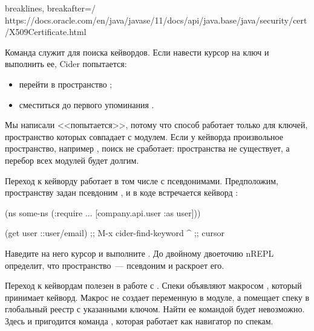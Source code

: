 \begin{english}
  \begin{text*}{breaklines, breakafter=/}
https://docs.oracle.com/en/java/javase/11/docs/api/java.base/java/security/cert/X509Certificate.html
  \end{text*}
\end{english}

Команда  служит для поиска кейвордов. Если навести курсор на ключ  и выполнить ее, Cider попытается:

\begin{itemize}

\item
  перейти в пространство ;

\item
  сместиться до первого упоминания .

\end{itemize}

Мы написали <<попытается>>, потому что способ работает только для ключей, пространство которых совпадает с модулем. Если у кейворда произвольное пространство, например , поиск не сработает: пространства  не существует, а перебор всех модулей будет долгим.

Переход к кейворду работает в том числе с псевдонимами. Предположим, пространству  задан псевдоним , и в коде встречается кейворд :

\begin{english}
  \begin{clojure}
(ns some-ns
  (:require
   ...
   [company.api.user :as user]))

(get user ::user/email) ;; M-x cider-find-keyword
                ^       ;; cursor
  \end{clojure}
\end{english}

Наведите на него курсор и выполните . До двойному двоеточию nREPL определит, что пространство~--- псевдоним и раскроет его.

Переход к кейвордам полезен в работе с . Спеки объявляют макросом , который принимает кейворд. Макрос не создает переменную в модуле, а помещает спеку в глобальный реестр с указанными ключом. Найти ее командой  будет невозможно. Здесь и пригодится команда , которая работает как навигатор по спекам.

